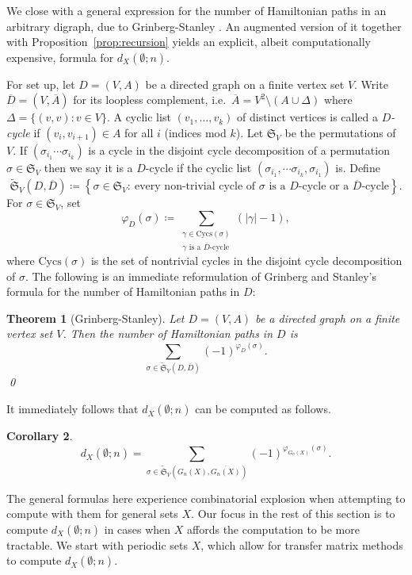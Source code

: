 \documentclass[12pt]{amsart}
\newtheorem{theorem}{Theorem}[section]
\newtheorem{corollary}[theorem]{Corollary}
\theoremstyle{definition}
\theoremstyle{remark}
\newcommand{\Sset}{\mathfrak{S}}
\newcommand{\set}[1]{\left\{#1\right\}}
\newcommand{\abs}[1]{\left|#1\right|}
\begin{document}
We close with a general expression for the number of Hamiltonian paths in an arbitrary digraph, due to
Grinberg-Stanley \cite[Thm.~6.6]{grinberg-stanley-redei-berge}. An augmented version of it together with Proposition~\ref{prop:recursion} yields an explicit, albeit computationally expensive, formula for $d_X(\emptyset;n)$.

For set up, let $D=(V,A)$ be a directed graph on a finite vertex set $V$. Write $\overline{D}=(V,\overline{A})$ for its loopless complement, i.e.\ $\overline{A}=V^2\setminus(A\cup\Delta)$ where
$\Delta=\{(v,v):v\in V\}$. A cyclic list $(v_1,\dots,v_k)$ of distinct vertices is called a \emph{$D$-cycle} if $(v_i,v_{i+1})\in A$ for all $i$
(indices mod $k$). Let $\Sset_V$ be the permutations of $V$. If $(\sigma_{i_1} \cdots \sigma_{i_k})$ is a cycle in the disjoint cycle decomposition of a permutation $\sigma \in \mathfrak{S}_V$ then we say it is a $D$-cycle if the cyclic list $(\sigma_{i_1}, \cdots \sigma_{i_k},\sigma_{i_1})$ is. Define
\[
\widetilde{\Sset}_V(D,\overline{D})\coloneqq\set{\sigma\in\Sset_V:\ \text{every non-trivial cycle of $\sigma$ is a $D$-cycle or a $\overline{D}$-cycle}}.
\]
For $\sigma\in\Sset_V$, set
\[
\varphi_D(\sigma)\coloneqq \sum_{\substack{\gamma\in\mathrm{Cycs}(\sigma)\\ \gamma\text{ is a $\overline{D}$-cycle}}} (\abs{\gamma}-1),
\]
where $\mathrm{Cycs}(\sigma)$ is the set of nontrivial cycles in the disjoint cycle decomposition of $\sigma$. The following is an immediate reformulation of Grinberg and Stanley's formula for the number of Hamiltonian paths in $D$:

\begin{theorem}[Grinberg-Stanley]\label{thm:darij}
Let $D=(V,A)$ be a directed graph on a finite vertex set $V$. Then the number of Hamiltonian paths in $D$ is
\[
\sum_{\sigma\in \widetilde{\Sset}_V(D,\overline{D})} (-1)^{\varphi_D(\sigma)}.
\] \qed
\end{theorem}
It immediately follows that $d_X(\emptyset;n)$ can be computed as follows.
\begin{corollary}
\[
d_X(\emptyset;n) = \sum_{\sigma\in \widetilde{\Sset}_V(G_n(X),\overline{G_n(X)})} (-1)^{\varphi_{G_n(X)}(\sigma)}.
\]
\end{corollary}

The general formulas here experience combinatorial explosion when attempting to compute with them for general sets $X$. Our focus in the rest of this section is to compute $d_X(\emptyset;n)$ in cases when $X$ affords the computation to be more tractable. We start with periodic sets $X$, which allow for transfer matrix methods to compute $d_X(\emptyset;n)$.
\end{document}
